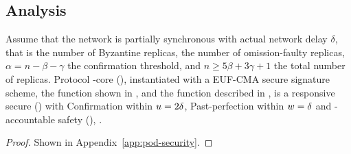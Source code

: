 \subsection{Analysis}

\begin{theorem}\label{thm:pod-security}
    Assume that the network is partially synchronous with actual network delay $\delta$, that \beta is the number of Byzantine replicas, \gamma the number of omission-faulty replicas, $\alpha = n - \beta - \gamma$ the confirmation threshold, and $n \geq 5 \beta + 3 \gamma + 1$ the total number of replicas. Protocol \podtm-core (), instantiated with a EUF-CMA secure signature scheme, the \opValid{} function shown in , and the \identify{} function described in , is a responsive secure \podtm () with Confirmation within $u = 2 \delta$, Past-perfection within $w = \delta$ and  \beta-accountable safety (), \ewnp.
\end{theorem}
\begin{proof}
    Shown in Appendix~\ref{app:pod-security}.
\end{proof}